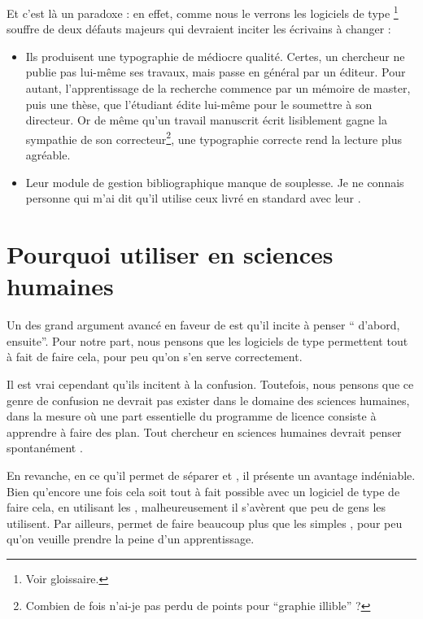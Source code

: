 Et c'est là un paradoxe : en effet, comme nous le verrons les logiciels de type \footnote{Voir gloissaire.} souffre de deux défauts majeurs qui devraient inciter les écrivains à changer :
\begin{itemize}
\item Ils produisent une typographie de médiocre qualité. Certes, un chercheur ne publie pas lui-même ses travaux, mais passe en général par un éditeur. Pour autant, l'apprentissage de la recherche commence par un mémoire de master, puis une thèse, que l'étudiant édite lui-même pour le soumettre à son directeur. Or de même qu'un travail manuscrit écrit lisiblement gagne la sympathie de son correcteur\footnote{Combien de fois n'ai-je pas perdu de points pour \enquote{graphie illible} ?},  une typographie correcte rend la lecture plus agréable.
\item Leur module de gestion bibliographique manque de souplesse. Je ne connais personne qui m'ai dit qu'il utilise ceux livré en standard avec leur .
\end{itemize}

\section{Pourquoi utiliser  en sciences humaines}

Un des grand argument avancé en faveur de \concept{\LaTeX} est qu'il incite à penser \enquote{ d'abord,  ensuite}. Pour notre part, nous pensons que les logiciels de type  permettent tout à fait de faire cela, pour peu qu'on s'en serve correctement. 

Il est vrai cependant qu'ils incitent à la confusion. Toutefois, nous pensons que ce genre de confusion ne devrait pas exister dans le domaine des sciences humaines, dans la mesure où une part essentielle du programme de licence consiste à apprendre à faire des plan. Tout chercheur en sciences humaines devrait penser spontanément .

En revanche, en ce qu'il permet de séparer  et , il présente un avantage indéniable. Bien qu'encore une fois cela soit tout à fait possible avec un logiciel de type  de faire cela, en utilisant les , malheureusement il s'avèrent que peu de gens les utilisent. Par ailleurs, \logiciel{\LaTeX} permet de faire beaucoup plus que les simples , pour peu qu'on veuille prendre la peine d'un apprentissage.

